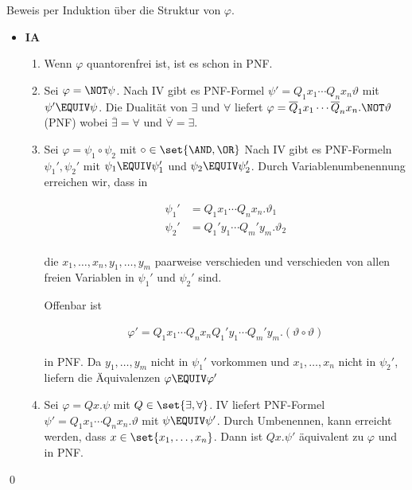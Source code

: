 Beweis per Induktion über die Struktur von $\varphi$.
\begin{itemize}
  \item \textbf{IA}
  \begin{enumerate}
    \item Wenn $\varphi$ quantorenfrei ist, ist es schon in PNF.
    \item Sei $\varphi = \NOT\psi$. Nach IV gibt es PNF-Formel $\psi' = Q_1x_1\cdots Q_nx_n \vartheta$ mit $\psi' \EQUIV \psi$. Die Dualität von $\exists$ und $\forall$ liefert
      $\varphi = \overline{Q}_1x_1 \cdots \overline{Q}_nx_n.\NOT\vartheta$ (PNF)
    wobei $\overline{\exists}=\forall$ und $\overline{\forall}=\exists$.
    
    \item Sei $\varphi = \psi_1 \circ \psi_2$ mit $\circ\in\set{\AND,\OR}$
    Nach IV gibt es PNF-Formeln $\psi_1', \psi_2'$ mit $\psi_1 \EQUIV \psi_1'$
    und $\psi_2 \EQUIV \psi_2'$. Durch Variablenumbenennung erreichen wir, dass in
    
    \begin{align}
      \psi_1' &= Q_1x_1 \cdots Q_nx_n. \vartheta_1 \\
      \psi_2' &= Q_1'y_1 \cdots Q_m'y_m. \vartheta_2 \\
    \end{align}
    
    die $x_1,\dots,x_n, y_1,\dots,y_m$ paarweise verschieden und verschieden von allen freien Variablen in $\psi_1'$ und $\psi_2'$ sind.
    
    Offenbar ist
    
    \begin{align}
      \varphi' = Q_1x_1\cdots Q_nx_n Q_1'y_1 \cdots Q_m'y_m .(\vartheta\circ\vartheta)
    \end{align}
    
    in PNF. Da $y_1,\dots,y_m$ nicht in $\psi_1'$ vorkommen und $x_1,\dots,x_n$ nicht in $\psi_2'$, liefern die Äquivalenzen $\varphi \EQUIV \varphi'$
    
    \item Sei $\varphi = Q x.\psi$ mit $Q \in\set{\exists, \forall}$.
    IV liefert PNF-Formel $\psi'=Q_1x_1\cdots Q_nx_n.\vartheta$
    mit $\psi \EQUIV \psi'$. Durch Umbenennen, kann erreicht werden,
    dass $x \in \set{x_1,\dots,x_n}$. Dann ist $Q x.\psi'$ äquivalent zu $\varphi$ und in PNF.
  \end{enumerate}
\end{itemize}
\qed



